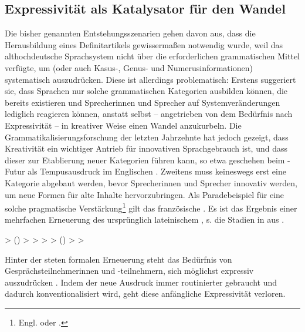 \subsection{Expressivität als Katalysator für den Wandel} \label{sec:kata}

Die bisher genannten Entstehungsszenarien gehen davon aus, dass die Herausbildung eines Definitartikels  gewissermaßen notwendig wurde, weil das althochdeutsche Sprachsystem nicht über die erforderlichen grammatischen Mittel verfügte, um  (oder auch Kasus-, Genus- und Numerusinformationen)    systematisch auszudrücken. Diese  ist allerdings problematisch: Erstens suggeriert sie, dass Sprachen nur solche grammatischen Kategorien ausbilden können, die bereits existieren und Sprecherinnen und Sprecher auf Systemveränderungen lediglich reagieren können, anstatt selbst -- angetrieben von dem Bedürfnis nach Expressivität -- in kreativer Weise einen Wandel anzukurbeln. Die Grammatikalisierungsforschung  der letzten Jahrzehnte hat jedoch gezeigt, dass Kreativität ein wichtiger Antrieb für innovativen Sprachgebrauch ist, und dass dieser zur Etablierung neuer Kategorien führen kann, so etwa geschehen beim -Futur als Tempusausdruck im Englischen \parencite[s. z.B.][30]{Heine1991}. Zweitens muss keineswegs erst eine Kategorie abgebaut werden, bevor Sprecherinnen und Sprecher innovativ werden, um neue Formen für alte Inhalte hervorzubringen. Als Paradebeispiel für eine solche pragmatische Verstärkung\footnote{Engl.  oder  \parencite[s.][94]{Hopper2006}.} gilt das französische  . Es ist das Ergebnis einer mehrfachen Erneuerung des ursprünglich lateinischem , s. die Stadien in  aus \textcite[94]{Hopper2006}. 

\begin{exe}
	\ex \label{ex:ca}   > ()    >  >  >  > ()  >  > 
\end{exe}

Hinter der steten formalen Erneuerung steht das Bedürfnis von Gesprächsteilnehmerinnen und -teilnehmern, sich möglichst expressiv auszudrücken \parencites[179]{Detges2002}[73]{Hopper2006}[176]{Lehmann2015}. Indem der neue Ausdruck immer routinierter gebraucht und dadurch konventionalisiert wird, geht diese anfängliche Expressivität verloren. 

